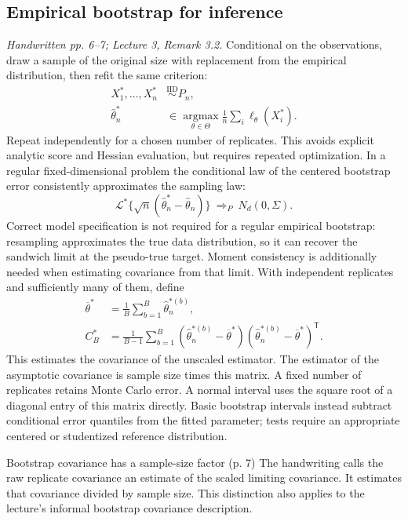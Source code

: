 \documentclass[12pt]{article}
\begin{document}
\subsection{Empirical bootstrap for inference}
\textit{Handwritten pp. 6--7; Lecture 3, Remark 3.2.}
Conditional on the observations, draw a sample of the original size with
replacement from the empirical distribution, then refit the same criterion:
\begin{align}
 X_1^*,\ldots,X_n^*&\overset{\mathrm{IID}}\sim P_n,\\
 \widehat\theta_n^*&\in\operatorname*{argmax}_{\theta\in\Theta}
 \frac1n\sum_i\ell_\theta(X_i^*).
\end{align}
Repeat independently for a chosen number of replicates. This avoids
explicit analytic score and Hessian evaluation, but requires repeated
optimization. In a regular fixed-dimensional problem the conditional law
of the centered bootstrap error consistently approximates the sampling law:
\begin{equation}
 \mathcal L^*\{\sqrt n(\widehat\theta_n^*-\widehat\theta_n)\}
 \ \Longrightarrow_P\ N_d(0,\Sigma).
\end{equation}
Correct model specification is not required for a regular empirical
bootstrap: resampling approximates the true data distribution, so it can
recover the sandwich limit at the pseudo-true target. Moment consistency
is additionally needed when estimating covariance from that limit.
With independent replicates and sufficiently many of them, define
\begin{align}
 \overline\theta^*&=\frac1B\sum_{b=1}^B\widehat\theta_n^{*(b)},\\
 C_B^*&=\frac1{B-1}\sum_{b=1}^B
 (\widehat\theta_n^{*(b)}-\overline\theta^*)
 (\widehat\theta_n^{*(b)}-\overline\theta^*)^{\mathsf T}.
\end{align}
This estimates the covariance of the unscaled estimator. The estimator of
the asymptotic covariance is sample size times this matrix. A fixed number
of replicates retains Monte Carlo error. A normal interval uses the square
root of a diagonal entry of this matrix directly. Basic bootstrap intervals
instead subtract conditional error quantiles from the fitted parameter;
tests require an appropriate centered or studentized reference distribution.
\begin{correctionbox}{Bootstrap covariance has a sample-size factor (p. 7)}
The handwriting calls the raw replicate covariance an estimate of the
scaled limiting covariance. It estimates that covariance divided by
sample size. This distinction also applies to the lecture's informal
bootstrap covariance description.
\end{correctionbox}
\end{document}
